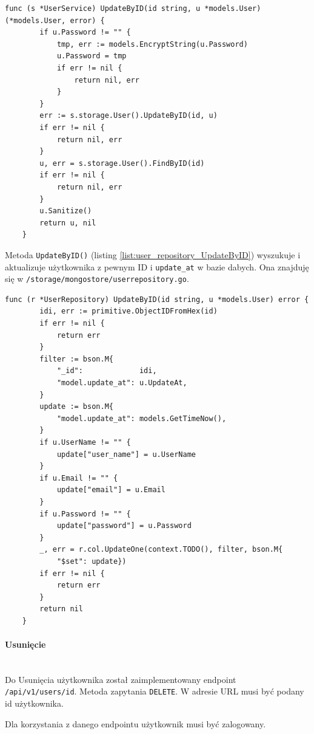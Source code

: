 \begin{lstlisting}[label=list:user_service_UpdateByID,caption=Serwis edycji użytkownika,basicstyle=\tiny\ttfamily]
    func (s *UserService) UpdateByID(id string, u *models.User) (*models.User, error) {
        if u.Password != "" {
            tmp, err := models.EncryptString(u.Password)
            u.Password = tmp
            if err != nil {
                return nil, err
            }
        }
        err := s.storage.User().UpdateByID(id, u)
        if err != nil {
            return nil, err
        }
        u, err = s.storage.User().FindByID(id)
        if err != nil {
            return nil, err
        }
        u.Sanitize()
        return u, nil
    }
\end{lstlisting}
Metoda \texttt{UpdateByID()} (listing \ref{list:user_repository_UpdateByID}) wyszukuje i aktualizuje użytkownika z pewnym ID i \texttt{update\_at} w bazie dabych.
Ona znajduję się w \texttt{/storage/mongostore/userrepository.go}.
\begin{lstlisting}[label=list:user_repository_UpdateByID,caption=Edycja uzytkownika w bazie danych,basicstyle=\tiny\ttfamily]
    func (r *UserRepository) UpdateByID(id string, u *models.User) error {
        idi, err := primitive.ObjectIDFromHex(id)
        if err != nil {
            return err
        }
        filter := bson.M{
            "_id":             idi,
            "model.update_at": u.UpdateAt,
        }
        update := bson.M{
            "model.update_at": models.GetTimeNow(),
        }
        if u.UserName != "" {
            update["user_name"] = u.UserName
        }
        if u.Email != "" {
            update["email"] = u.Email
        }
        if u.Password != "" {
            update["password"] = u.Password
        }
        _, err = r.col.UpdateOne(context.TODO(), filter, bson.M{
            "$set": update})
        if err != nil {
            return err
        }
        return nil
    }
\end{lstlisting}

\paragraph{Usunięcie}\mbox{}\\

Do Usunięcia użytkownika został zaimplementowany endpoint \texttt{/api/v1/users/{id}}.
Metoda zapytania \texttt{DELETE}.
W adresie URL musi być podany id użytkownika.

Dla korzystania z danego endpointu użytkownik musi być zalogowany.


